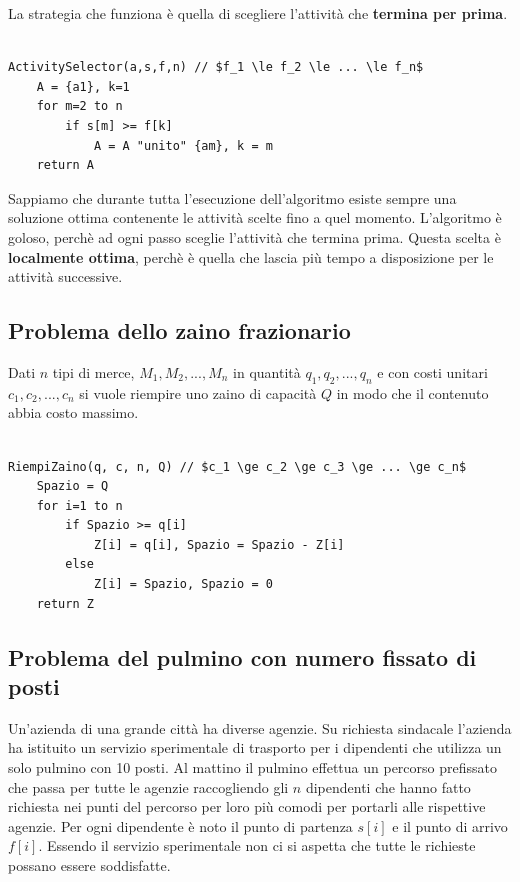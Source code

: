 La strategia che funziona è quella di scegliere l'attività che \textbf{termina per prima}.

\begin{lstlisting}[mathescape=true,caption=Algoritmo di selezione delle attività]

ActivitySelector(a,s,f,n) // $f_1 \le f_2 \le ... \le f_n$
	A = {a1}, k=1
	for m=2 to n
		if s[m] >= f[k]
			A = A "unito" {am}, k = m
	return A

\end{lstlisting}

Sappiamo che durante tutta l'esecuzione dell'algoritmo esiste sempre una soluzione ottima contenente le attività scelte fino a quel momento. L'algoritmo è goloso, perchè ad ogni passo sceglie l'attività che termina prima. Questa scelta è \textbf{localmente ottima}, perchè è quella che lascia più tempo a disposizione per le attività successive.

\subsection{Problema dello zaino frazionario}

Dati $n$ tipi di merce, $M_1,M_2,...,M_n$ in quantità $q_1,q_2,...,q_n$ e con costi unitari $c_1,c_2,...,c_n$ si vuole riempire uno zaino di capacità $Q$ in modo che il contenuto abbia costo massimo.

\begin{lstlisting}[mathescape=true,caption=Algoritmo goloso dello zaino frazionario]

RiempiZaino(q, c, n, Q) // $c_1 \ge c_2 \ge c_3 \ge ... \ge c_n$
	Spazio = Q
	for i=1 to n
		if Spazio >= q[i]
			Z[i] = q[i], Spazio = Spazio - Z[i]
		else
			Z[i] = Spazio, Spazio = 0
	return Z

\end{lstlisting}

\subsection{Problema del pulmino con numero fissato di posti}

Un'azienda di una grande città ha diverse agenzie. Su richiesta sindacale l'azienda ha istituito un servizio sperimentale di trasporto per i dipendenti che utilizza un solo pulmino con 10 posti. Al mattino il pulmino effettua un percorso prefissato che passa per tutte le agenzie raccogliendo gli $n$ dipendenti che hanno fatto richiesta nei punti del percorso per loro più comodi per portarli alle rispettive agenzie. Per ogni dipendente è noto il punto di partenza $s[i]$ e il punto di arrivo $f[i]$. Essendo il servizio sperimentale non ci si aspetta che tutte le richieste possano essere soddisfatte.

